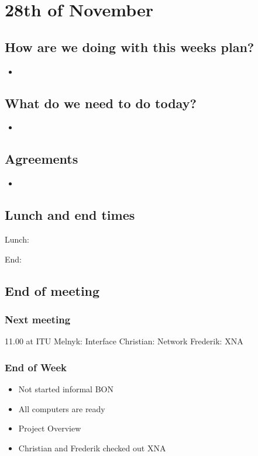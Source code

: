 \section{28th of November}
\subsection{How are we doing with this weeks plan?}
\begin{itemize}
\item  
\end{itemize}

\subsection{What do we need to do today?}
\begin{itemize}
\item 
\end{itemize}

\subsection{Agreements}
\begin{itemize}
\item 
\end{itemize}
\subsection{Lunch and end times}
Lunch:

End:

\subsection{End of meeting}
\subsubsection{Next meeting}
11.00 at ITU
Melnyk: Interface
Christian: Network
Frederik: XNA
\subsubsection{End of Week}
\begin{itemize}
\item Not started informal BON
\item All computers are ready
\item Project Overview
\item Christian and Frederik checked out XNA
\end{itemize}